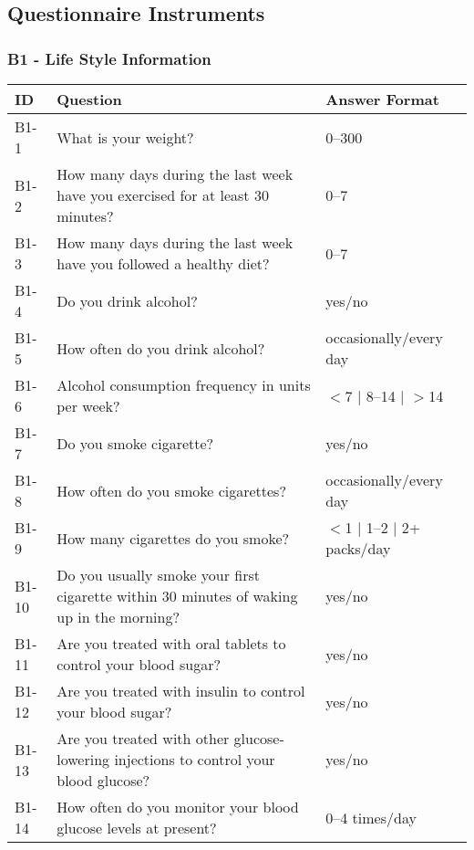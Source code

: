 \subsection{Questionnaire Instruments}

\subsubsection{B1 - Life Style Information}\label{sec:B1-life-style}
\begin{table}[H]
    \centering
    \renewcommand{\arraystretch}{1.2}
    \begin{tabularx}{\textwidth}{|l|X|l|}
        \hline
        \textbf{ID} & \textbf{Question} & \textbf{Answer Format} \\ \hline
        B1-1  & What is your weight? & 0--300 \\ \hline
        B1-2  & How many days during the last week have you exercised for at least 30 minutes? & 0--7 \\ \hline
        B1-3  & How many days during the last week have you followed a healthy diet? & 0--7 \\ \hline
        B1-4  & Do you drink alcohol? & yes/no \\ \hline
        B1-5  & How often do you drink alcohol? & occasionally/every day \\ \hline
        B1-6  & Alcohol consumption frequency in units per week? & $<$7 $\mid$ 8--14 $\mid$ $>$14 \\ \hline
        B1-7  & Do you smoke cigarette? & yes/no \\ \hline
        B1-8  & How often do you smoke cigarettes? & occasionally/every day \\ \hline
        B1-9  & How many cigarettes do you smoke? & $<$1 $\mid$ 1--2 $\mid$ 2+ packs/day \\ \hline
        B1-10 & Do you usually smoke your first cigarette within 30 minutes of waking up in the morning? & yes/no \\ \hline
        B1-11 & Are you treated with oral tablets to control your blood sugar? & yes/no \\ \hline
        B1-12 & Are you treated with insulin to control your blood sugar? & yes/no \\ \hline
        B1-13 & Are you treated with other glucose-lowering injections to control your blood glucose? & yes/no \\ \hline
        B1-14 & How often do you monitor your blood glucose levels at present? & 0--4 times/day \\ \hline

\end{tabularx}
\end{table}
